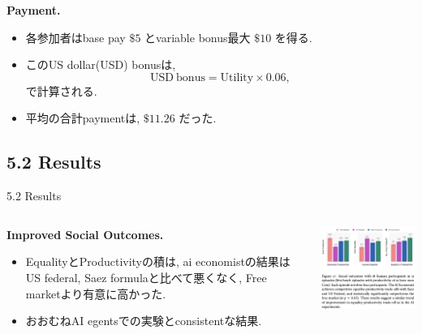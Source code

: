 \documentclass[unicode,aspectratio=169,11pt]{beamer}
\begin{document}
\begin{frame}{}{}
{\bf Payment.}
\begin{itemize}
    \item 各参加者はbase pay $\$5$ とvariable bonus最大 $\$10$ を得る.
    \item このUS dollar(USD) bonusは, \[\mathrm{USD\ bonus} = \mathrm{Utility}\times 0.06, \tag{26}\]で計算される.
    \item 平均の合計paymentは, $\$ 11.26$ だった.
\end{itemize}
\end{frame}

\subsection{5.2 Results}
\begin{frame}{5.2 Results}{}
    \begin{columns}
        \begin{column}{0.5\textwidth}
            {\bf Improved Social Outcomes.}
            \begin{itemize}
                \item EqualityとProductivityの積は, ai economistの結果はUS federal, Saez formulaと比べて悪くなく, Free marketより有意に高かった.
                \item おおむねAI egentsでの実験とconsistentな結果.
            \end{itemize}
        \end{column}
        \begin{column}{0.5\textwidth}
            \begin{center}
                \includegraphics[width=7cm]{figure17.png}
            \end{center}
        \end{column}
    \end{columns}
\end{frame}
\end{document}
